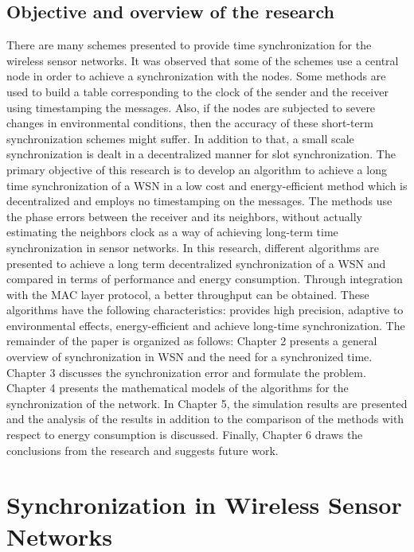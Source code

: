 \documentclass[a4paper,10pt]{report}
\begin{document}
\section{\textbf{Objective and overview of the research}}
\noindent There are many schemes presented to provide time
synchronization for the wireless sensor networks. It was observed
that some of the schemes use a central node in order to achieve a
synchronization with the nodes. Some methods are used
to build a table corresponding to the clock of the sender and the
receiver using timestamping the messages. Also, if the nodes are
subjected to severe changes in environmental conditions, then the
accuracy of these short-term synchronization schemes might suffer.
In addition to that, a small scale synchronization is dealt in a
decentralized manner for slot synchronization.
\newline
The primary objective of this research is to develop an algorithm to
achieve a long time synchronization of a WSN in a low cost and
energy-efficient method which is decentralized and employs no
timestamping on the messages. The methods use the phase errors
between the receiver and its neighbors, without actually estimating the neighbors
clock as a way of achieving long-term time synchronization in sensor
networks. In this research, different algorithms are presented to
achieve a long term decentralized synchronization of a WSN and
compared in terms of performance and energy consumption.
Through integration with the MAC layer protocol, a better
throughput can be obtained. These algorithms have the following
characteristics: provides high precision, adaptive to environmental
effects, energy-efficient and achieve long-time synchronization.
\newline The remainder of the paper is organized as follows:  Chapter 2
presents a general overview of synchronization in WSN and the need
for a synchronized time. Chapter 3 discusses the synchronization
error and formulate the problem. Chapter 4 presents the
mathematical models of the algorithms for the synchronization of the
network. In Chapter 5, the simulation results are presented and the
analysis of the results in addition to the comparison of the methods
with respect to energy consumption is discussed. Finally, Chapter 6
draws the conclusions from the research and suggests future work.
\chapter{\textbf{Synchronization in Wireless Sensor Networks}}
\end{document}
